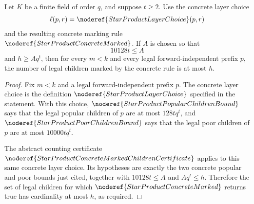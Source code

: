 \begin{helper}
Let \(K\) be a finite field of order \(q\), and suppose \(t\ge2\).  Use the
concrete layer choice
\[
  \ell(p,r)=\noderef{StarProductLayerChoice}(p,r)
\]
and the resulting concrete marking rule
\(\noderef{StarProductConcreteMarked}\).  If \(A\) is chosen so that
\[
  10128t\le A
\]
and \(h\ge Aq^t\), then for every \(m<k\) and every legal
forward-independent prefix \(p\), the number of legal children marked by the
concrete rule is at most \(h\).
\end{helper}
\begin{proof}
Fix \(m<k\) and a legal forward-independent prefix \(p\).  The concrete
layer choice is the definition \(\noderef{StarProductLayerChoice}\) specified
in the statement.  With this choice,
\(\noderef{StarProductPopularChildrenBound}\) says that the legal popular
children of \(p\) are at most \(128tq^t\), and
\(\noderef{StarProductPoorChildrenBound}\) says that the legal poor children
of \(p\) are at most \(10000tq^t\).

The abstract counting certificate
\(\noderef{StarProductConcreteMarkedChildrenCertificate}\) applies to this
same concrete layer choice.  Its hypotheses are exactly the two concrete
popular and poor bounds just cited, together with \(10128t\le A\) and
\(Aq^t\le h\).  Therefore the set of legal children for which
\(\noderef{StarProductConcreteMarked}\) returns true has cardinality at most
\(h\), as required.
\end{proof}
